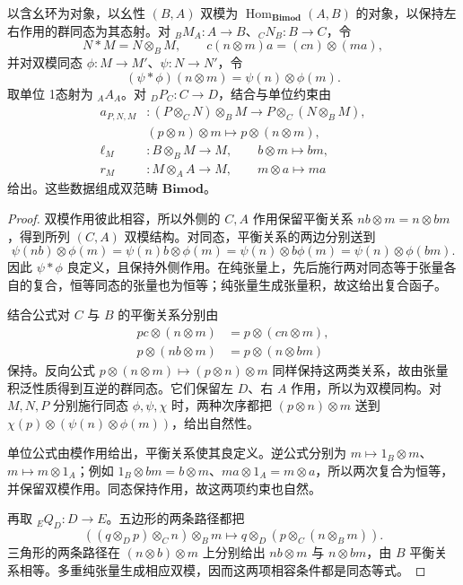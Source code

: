 \begin{proposition}\label{b4:prop:F-bimodule-bicategory}
	以含幺环为对象，以幺性 \((B,A)\) 双模为 \(\operatorname{Hom}_{\mathbf{Bimod}}(A,B)\) 的对象，以保持左右作用的群同态为其态射。对 \({}_BM_A:A\rightarrow B\)、\({}_CN_B:B\rightarrow C\)，令
	\[
		N*M=N\otimes_B M, \qquad c(n\otimes m)a=(cn)\otimes(ma),
	\]
	并对双模同态 \(\phi:M\rightarrow M'\)、\(\psi:N\rightarrow N'\)，令
	\[
		(\psi*\phi)(n\otimes m)=\psi(n)\otimes\phi(m).
	\]
	取单位 1态射为 \({}_AA_A\)。对 \({}_DP_C:C\rightarrow D\)，结合与单位约束由
	\[
		\begin{aligned}
			a_{P,N,M}&:(P\otimes_C N)\otimes_B M \longrightarrow P\otimes_C(N\otimes_B M),\\
			&(p\otimes n)\otimes m\longmapsto p\otimes(n\otimes m),\\
			\ell_M&:B\otimes_B M\longrightarrow M, \qquad b\otimes m\longmapsto bm,\\
			r_M&:M\otimes_A A\longrightarrow M, \qquad m\otimes a\longmapsto ma
		\end{aligned}
	\]
	给出。这些数据组成双范畴 \(\mathbf{Bimod}\)。
\end{proposition}
\begin{proof}
	双模作用彼此相容，所以外侧的 \(C,A\) 作用保留平衡关系 \(nb\otimes m=n\otimes bm\)，得到所列 \((C,A)\) 双模结构。对同态，平衡关系的两边分别送到
	\[
		\psi(nb)\otimes\phi(m) =\psi(n)b\otimes\phi(m) =\psi(n)\otimes b\phi(m) =\psi(n)\otimes\phi(bm).
	\]
	因此 \(\psi*\phi\) 良定义，且保持外侧作用。在纯张量上，先后施行两对同态等于张量各自的复合，恒等同态的张量也为恒等；纯张量生成张量积，故这给出复合函子。

	结合公式对 \(C\) 与 \(B\) 的平衡关系分别由
	\[
		\begin{aligned}
			pc\otimes(n\otimes m)&=p\otimes(cn\otimes m),\\
			p\otimes(nb\otimes m)&=p\otimes(n\otimes bm)
		\end{aligned}
	\]
	保持。反向公式 \(p\otimes(n\otimes m)\mapsto(p\otimes n)\otimes m\) 同样保持这两类关系，故由张量积泛性质得到互逆的群同态。它们保留左 \(D\)、右 \(A\) 作用，所以为双模同构。对 \(M,N,P\) 分别施行同态 \(\phi,\psi,\chi\) 时，两种次序都把 \((p\otimes n)\otimes m\) 送到 \(\chi(p)\otimes(\psi(n)\otimes\phi(m))\)，给出自然性。

	单位公式由模作用给出，平衡关系使其良定义。逆公式分别为 \(m\mapsto1_B\otimes m\)、\(m\mapsto m\otimes1_A\)；例如 \(1_B\otimes bm=b\otimes m\)、\(ma\otimes1_A=m\otimes a\)，所以两次复合为恒等，并保留双模作用。同态保持作用，故这两项约束也自然。

	再取 \({}_EQ_D:D\rightarrow E\)。五边形的两条路径都把
	\[
		((q\otimes_D p)\otimes_C n)\otimes_B m \longmapsto q\otimes_D(p\otimes_C(n\otimes_B m)).
	\]
	三角形的两条路径在 \((n\otimes b)\otimes m\) 上分别给出 \(nb\otimes m\) 与 \(n\otimes bm\)，由 \(B\) 平衡关系相等。多重纯张量生成相应双模，因而这两项相容条件都是同态等式。
\end{proof}

